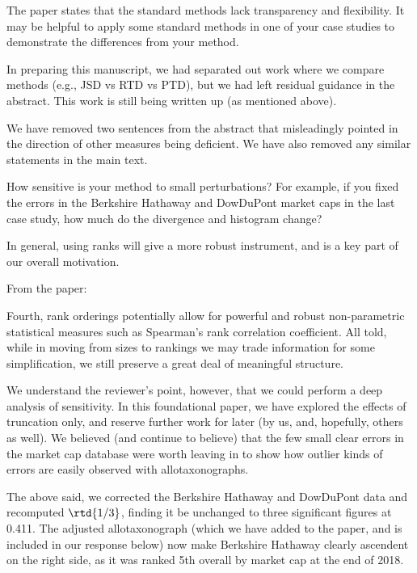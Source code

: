 \begin{reviewercomment}
  The paper states that the standard methods lack transparency and flexibility.
  It may be helpful to apply some standard methods in one of your case studies to demonstrate the differences from your method.
\end{reviewercomment}

In preparing this manuscript,
we had separated out work where we compare methods (e.g., JSD vs RTD vs PTD),
but we had left residual guidance in the abstract.
This work is still being written up (as mentioned above).

We have removed two sentences from the abstract that misleadingly pointed
in the direction of other measures being deficient.
We have also removed any similar statements in the main text.

\begin{reviewercomment}
  How sensitive is your method to small perturbations? For example,
  if you fixed the errors in the Berkshire Hathaway and DowDuPont market
  caps in the last case study, how much do the divergence and histogram change?
\end{reviewercomment}

In general, using ranks will give a more robust instrument,
and is a key part of our overall motivation.

From the paper:
\begin{excerpt}
  Fourth, rank orderings
  potentially allow for powerful and robust non-parametric statistical measures
  such as Spearman's rank correlation coefficient.
  All told,
  while in moving from sizes to rankings
  we may
  trade information for some simplification,
  we still preserve a great deal of meaningful structure.
\end{excerpt}

We understand the reviewer's point, however,
that we could perform a deep analysis of sensitivity.
In this foundational paper, we have explored the effects of truncation only,
and reserve further work for later (by us, and, hopefully, others as well).
We believed (and continue to believe) that
the few small clear errors in the market cap database were worth
leaving in to show how outlier kinds of errors are easily observed
with allotaxonographs.

The above said, we corrected the Berkshire Hathaway and DowDuPont data
and recomputed $\rtd{1/3}$, finding it be unchanged to three significant figures
at 0.411.
The adjusted allotaxonograph (which we have added to the paper, and is included in our response below)
now make Berkshire Hathaway clearly ascendent
on the right side, as it was ranked 5th overall by market cap at the end of 2018.


